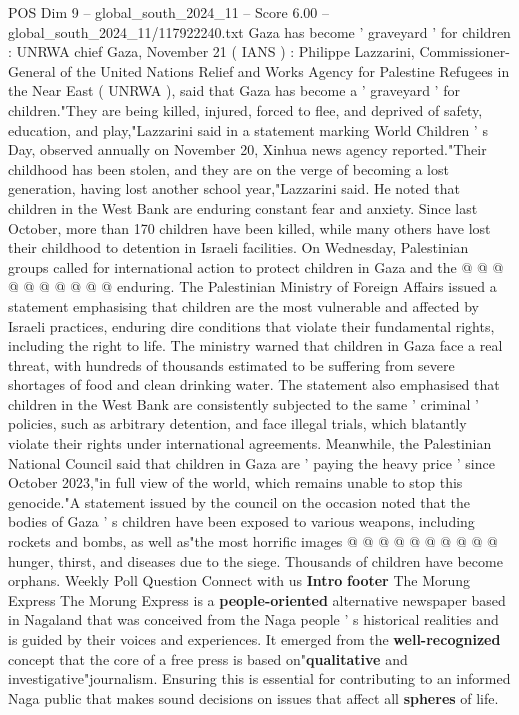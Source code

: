 \begin{textsample}{POS Dim 9 – global\_south\_2024\_11 – Score 6.00 – global\_south\_2024\_11/117922240.txt}  \label{ex:f9_pos_142}
Gaza has become ' graveyard ' for children : UNRWA chief Gaza, November 21 ( IANS ) : Philippe Lazzarini, Commissioner-General of the United Nations Relief and Works Agency for Palestine Refugees in the Near East ( UNRWA ), said that Gaza has become a ' graveyard ' for children."They are being killed, injured, forced to flee, and deprived of safety, education, and play,"Lazzarini said in a statement marking World Children ' s Day, observed annually on November 20, Xinhua news agency reported."Their childhood has been stolen, and they are on the verge of becoming a lost generation, having lost another school year,"Lazzarini said.
He noted that children in the West Bank are enduring constant fear and anxiety.
Since last October, more than 170 children have been killed, while many others have lost their childhood to detention in Israeli facilities.
On Wednesday, Palestinian groups called for international action to protect children in Gaza and the @ @ @ @ @ @ @ @ @ @ enduring.
The Palestinian Ministry of Foreign Affairs issued a statement emphasising that children are the most vulnerable and affected by Israeli practices, enduring dire conditions that violate their fundamental rights, including the right to life.
The ministry warned that children in Gaza face a real threat, with hundreds of thousands estimated to be suffering from severe shortages of food and clean drinking water.
The statement also emphasised that children in the West Bank are consistently subjected to the same ' criminal ' policies, such as arbitrary detention, and face illegal trials, which blatantly violate their rights under international agreements.
Meanwhile, the Palestinian National Council said that children in Gaza are ' paying the heavy price ' since October 2023,"in full view of the world, which remains unable to stop this genocide."A statement issued by the council on the occasion noted that the bodies of Gaza ' s children have been exposed to various weapons, including rockets and bombs, as well as"the most horrific images @ @ @ @ @ @ @ @ @ @ hunger, thirst, and diseases due to the siege.
Thousands of children have become orphans.
Weekly Poll Question Connect with us \textbf{Intro} \textbf{footer} The Morung Express The Morung Express is a \textbf{people-oriented} alternative newspaper based in Nagaland that was conceived from the Naga people ' s historical realities and is guided by their voices and experiences.
It emerged from the \textbf{well-recognized} concept that the core of a free press is based on"\textbf{qualitative} and investigative"journalism.
Ensuring this is essential for contributing to an informed Naga public that makes sound decisions on issues that affect all \textbf{spheres} of life.

\end{textsample}
